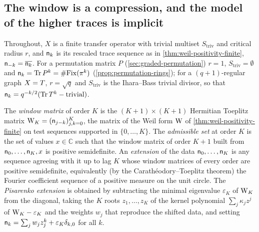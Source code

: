 \subsection{The window is a compression, and the model of the higher traces is implicit}

Throughout, $X$ is a finite transfer operator with trivial multiset $S_{\mathrm{triv}}$ and
critical radius $r$, and $\mathsf n_{k}$ is its rescaled trace sequence as in
\cref{thm:weil-positivity-finite}, $\mathsf n_{-k} = \overline{\mathsf n_{k}}$. For a permutation matrix
$P$ (\cref{sec:graded-permutation}) $r = 1$, $S_{\mathrm{triv}} = \emptyset$ and
$\mathsf n_{k} = \operatorname{Tr} P^k = \#\mathrm{Fix}(\pi^k)$ (\cref{prop:permutation-rings}); for a
$(q+1)$-regular graph $X = T$, $r = \sqrt q$ and $S_{\mathrm{triv}}$ is the Ihara--Bass
trivial divisor, so that $\mathsf n_{k} = q^{-k/2}(\operatorname{Tr}T^k - \text{trivial})$.

\begin{definition}
\label{def:window-extension-set}
The \emph{window matrix} of order $K$ is the $(K+1)\times(K+1)$ Hermitian Toeplitz matrix
$\mathrm{W}_K = (\mathsf n_{j-k})_{j,k=0}^{K}$, the matrix of the Weil form $\mathrm{W}$ of
\cref{thm:weil-positivity-finite} on test sequences supported in $\{0,\dots,K\}$. The
\emph{admissible set} at order $K$ is the set of values $x\in\mathbb C$ such that the window
matrix of order $K+1$ built from $\mathsf n_{0},\dots,\mathsf n_{K},x$ is positive semidefinite. An
\emph{extension} of the data $\mathsf n_{0},\dots,\mathsf n_{K}$ is any sequence agreeing with it up to lag
$K$ whose window matrices of every order are positive semidefinite, equivalently (by the
Carath\'eodory--Toeplitz theorem) the Fourier coefficient sequence of a positive measure on the
unit circle. The \emph{Pisarenko extension} is obtained by subtracting the minimal eigenvalue
$\varepsilon_K$ of $\mathrm{W}_K$ from the diagonal, taking the $K$ roots $z_1,\dots,z_K$ of the
kernel polynomial $\sum_j\kappa_jz^j$ of $\mathrm{W}_K - \varepsilon_K$ and the weights $w_j$ that
reproduce the shifted data, and setting $\mathsf n_{k} = \sum_j w_jz_j^k + \varepsilon_K\delta_{k,0}$
for all $k$.
\end{definition}

